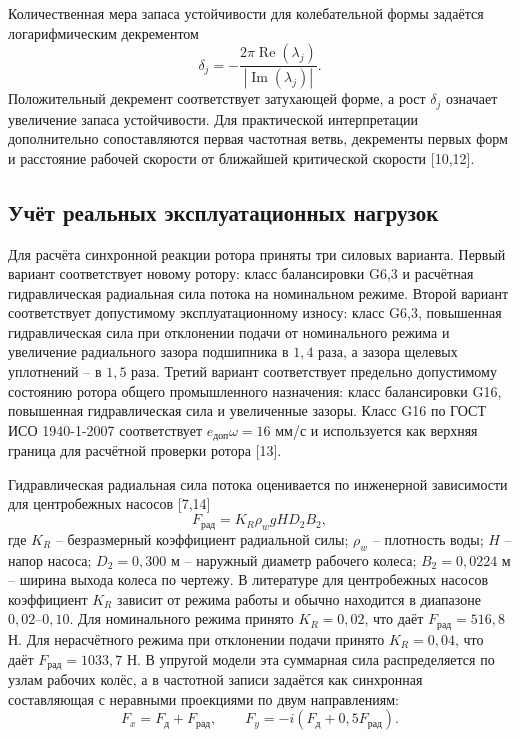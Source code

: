 \documentclass[14pt,a4paper]{extarticle}
\numberwithin{equation}{section}
\numberwithin{figure}{section}
\numberwithin{table}{section}
\begin{document}
Количественная мера запаса устойчивости для колебательной формы задаётся логарифмическим декрементом
\begin{equation}
    \delta_j=-\frac{2\pi\operatorname{Re}(\lambda_j)}{|\operatorname{Im}(\lambda_j)|}.
    \label{eq:log_decrement}
\end{equation}
Положительный декремент соответствует затухающей форме, а рост $\delta_j$ означает увеличение запаса устойчивости. Для практической интерпретации дополнительно сопоставляются первая частотная ветвь, декременты первых форм и расстояние рабочей скорости от ближайшей критической скорости [10,12].

\subsection{Учёт реальных эксплуатационных нагрузок}

Для расчёта синхронной реакции ротора приняты три силовых варианта. Первый вариант соответствует новому ротору: класс балансировки G6,3 и расчётная гидравлическая радиальная сила потока на номинальном режиме. Второй вариант соответствует допустимому эксплуатационному износу: класс G6,3, повышенная гидравлическая сила при отклонении подачи от номинального режима и увеличение радиального зазора подшипника в $1{,}4$ раза, а зазора щелевых уплотнений -- в $1{,}5$ раза. Третий вариант соответствует предельно допустимому состоянию ротора общего промышленного назначения: класс балансировки G16, повышенная гидравлическая сила и увеличенные зазоры. Класс G16 по ГОСТ ИСО 1940-1-2007 соответствует $e_{\text{доп}}\omega=16$ мм/с и используется как верхняя граница для расчётной проверки ротора [13].

Гидравлическая радиальная сила потока оценивается по инженерной зависимости для центробежных насосов [7,14]
\begin{equation}
    F_{\text{рад}}=K_R\rho_w gH D_2B_2,
    \label{eq:hydraulic_force_stage}
\end{equation}
где $K_R$ -- безразмерный коэффициент радиальной силы; $\rho_w$ -- плотность воды; $H$ -- напор насоса; $D_2=0{,}300$ м -- наружный диаметр рабочего колеса; $B_2=0{,}0224$ м -- ширина выхода колеса по чертежу. В литературе для центробежных насосов коэффициент $K_R$ зависит от режима работы и обычно находится в диапазоне $0{,}02$--$0{,}10$. Для номинального режима принято $K_R=0{,}02$, что даёт $F_{\text{рад}}=516{,}8$ Н. Для нерасчётного режима при отклонении подачи принято $K_R=0{,}04$, что даёт $F_{\text{рад}}=1033{,}7$ Н. В упругой модели эта суммарная сила распределяется по узлам рабочих колёс, а в частотной записи задаётся как синхронная составляющая с неравными проекциями по двум направлениям:
\begin{equation}
    F_x=F_{\text{д}}+F_{\text{рад}},\qquad F_y=-i(F_{\text{д}}+0{,}5F_{\text{рад}}).
    \label{eq:hydraulic_force_components}
\end{equation}
\end{document}
